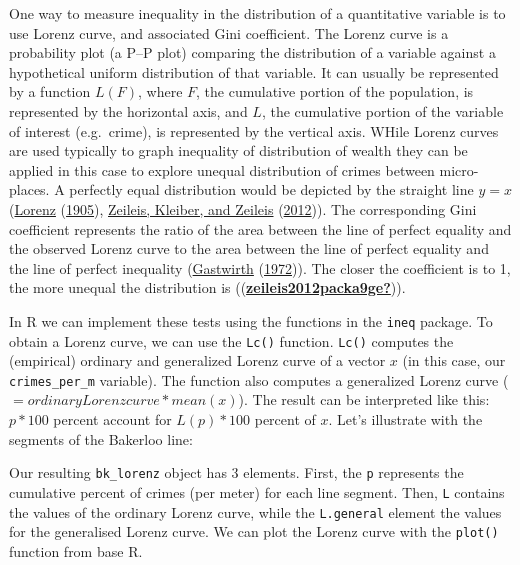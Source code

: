 \documentclass[
  krantz2]{krantz}
\makeatletter
\newenvironment{Shaded}{\begin{snugshade}}{\end{snugshade}}
\newcommand{\FunctionTok}[1]{\textcolor[rgb]{0,0,0}{#1}}
\newcommand{\NormalTok}[1]{#1}
\newcommand{\OtherTok}[1]{\textcolor[rgb]{0.37,0.37,0.37}{#1}}
\newcommand{\SpecialCharTok}[1]{\textcolor[rgb]{0,0,0}{#1}}
\newenvironment{kframe}{%
\medskip{}
\setlength{\fboxsep}{.8em}
 \def\at@end@of@kframe{}%
 \ifinner\ifhmode%
  \def\at@end@of@kframe{\end{minipage}}%
  \begin{minipage}{\columnwidth}%
 \fi\fi%
 \def\FrameCommand##1{\hskip\@totalleftmargin \hskip-\fboxsep
 \colorbox{shadecolor}{##1}\hskip-\fboxsep
     \hskip-\linewidth \hskip-\@totalleftmargin \hskip\columnwidth}%
 \MakeFramed {\advance\hsize-\width
   \@totalleftmargin\z@ \linewidth\hsize
   \@setminipage}}%
 {\par\unskip\endMakeFramed%
 \at@end@of@kframe}
\renewenvironment{Shaded}{\begin{kframe}}{\end{kframe}}
\makeatother
\begin{document}
One way to measure inequality in the distribution of a quantitative variable is to use Lorenz curve, and associated Gini coefficient. The Lorenz curve is a probability plot (a P--P plot) comparing the distribution of a variable against a hypothetical uniform distribution of that variable. It can usually be represented by a function \(L(F)\), where \(F\), the cumulative portion of the population, is represented by the horizontal axis, and \(L\), the cumulative portion of the variable of interest (e.g.~crime), is represented by the vertical axis. WHile Lorenz curves are used typically to graph inequality of distribution of wealth they can be applied in this case to explore unequal distribution of crimes between micro-places. A perfectly equal distribution would be depicted by the straight line \(y = x\) (\protect\hyperlink{ref-lorenz1905methods}{Lorenz} (\protect\hyperlink{ref-lorenz1905methods}{1905}), \protect\hyperlink{ref-zeileis2012package}{Zeileis, Kleiber, and Zeileis} (\protect\hyperlink{ref-zeileis2012package}{2012})). The corresponding Gini coefficient represents the ratio of the area between the line of perfect equality and the observed Lorenz curve to the area between the line of perfect equality and the line of perfect inequality (\protect\hyperlink{ref-gastwirth1972estimation}{Gastwirth} (\protect\hyperlink{ref-gastwirth1972estimation}{1972})). The closer the coefficient is to 1, the more unequal the distribution is ((\protect\hyperlink{ref-zeileis2012packa9ge}{\textbf{zeileis2012packa9ge?}})).

In R we can implement these tests using the functions in the \texttt{ineq} package. To obtain a Lorenz curve, we can use the \texttt{Lc()} function. \texttt{Lc()} computes the (empirical) ordinary and generalized Lorenz curve of a vector \(x\) (in this case, our \texttt{crimes\_per\_m} variable). The function also computes a generalized Lorenz curve ( \(= ordinary Lorenz curve * mean(x)\)). The result can be interpreted like this: \(p*100\) percent account for \(L(p)*100\) percent of \(x\). Let's illustrate with the segments of the Bakerloo line:

\begin{Shaded}
\end{Shaded}

Our resulting \texttt{bk\_lorenz} object has 3 elements. First, the \texttt{p} represents the cumulative percent of crimes (per meter) for each line segment. Then, \texttt{L} contains the values of the ordinary Lorenz curve, while the \texttt{L.general} element the values for the generalised Lorenz curve. We can plot the Lorenz curve with the \texttt{plot()} function from base R.
\end{document}
